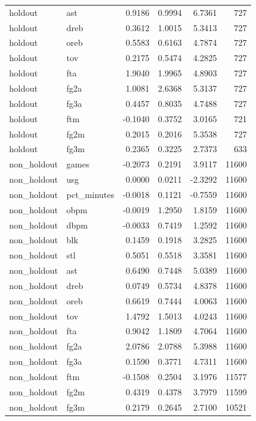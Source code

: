 \begin{table}
\begin{tabular}{llrrrr}
holdout & ast & 0.9186 & 0.9994 & 6.7361 & 727 \\
holdout & dreb & 0.3612 & 1.0015 & 5.3413 & 727 \\
holdout & oreb & 0.5583 & 0.6163 & 4.7874 & 727 \\
holdout & tov & 0.2175 & 0.5474 & 4.2825 & 727 \\
holdout & fta & 1.9040 & 1.9965 & 4.8903 & 727 \\
holdout & fg2a & 1.0081 & 2.6368 & 5.3137 & 727 \\
holdout & fg3a & 0.4457 & 0.8035 & 4.7488 & 727 \\
holdout & ftm & -0.1040 & 0.3752 & 3.0165 & 721 \\
holdout & fg2m & 0.2015 & 0.2016 & 5.3538 & 727 \\
holdout & fg3m & 0.2365 & 0.3225 & 2.7373 & 633 \\
non\_holdout & games & -0.2073 & 0.2191 & 3.9117 & 11600 \\
non\_holdout & usg & 0.0000 & 0.0211 & -2.3292 & 11600 \\
non\_holdout & pct\_minutes & -0.0018 & 0.1121 & -0.7559 & 11600 \\
non\_holdout & obpm & -0.0019 & 1.2950 & 1.8159 & 11600 \\
non\_holdout & dbpm & -0.0033 & 0.7419 & 1.2592 & 11600 \\
non\_holdout & blk & 0.1459 & 0.1918 & 3.2825 & 11600 \\
non\_holdout & stl & 0.5051 & 0.5518 & 3.3581 & 11600 \\
non\_holdout & ast & 0.6490 & 0.7448 & 5.0389 & 11600 \\
non\_holdout & dreb & 0.0749 & 0.5734 & 4.8378 & 11600 \\
non\_holdout & oreb & 0.6619 & 0.7444 & 4.0063 & 11600 \\
non\_holdout & tov & 1.4792 & 1.5013 & 4.0243 & 11600 \\
non\_holdout & fta & 0.9042 & 1.1809 & 4.7064 & 11600 \\
non\_holdout & fg2a & 2.0786 & 2.0788 & 5.3988 & 11600 \\
non\_holdout & fg3a & 0.1590 & 0.3771 & 4.7311 & 11600 \\
non\_holdout & ftm & -0.1508 & 0.2504 & 3.1976 & 11577 \\
non\_holdout & fg2m & 0.4319 & 0.4378 & 3.7979 & 11599 \\
non\_holdout & fg3m & 0.2179 & 0.2645 & 2.7100 & 10521 \\
\bottomrule
\end{tabular}
\end{table}
